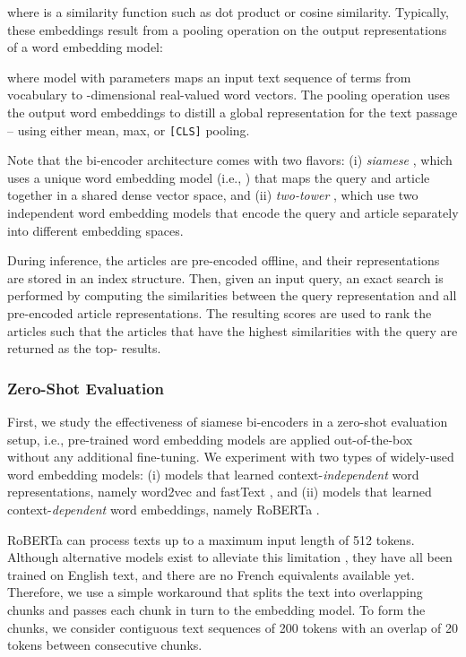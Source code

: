 \documentclass[11pt]{article}
\begin{document}
where  is a similarity function such as dot product or cosine similarity. Typically, these embeddings result from a pooling operation on the output representations of a word embedding model:

where model  with parameters  maps an input text sequence of  terms from vocabulary  to -dimensional real-valued word vectors. The pooling operation  uses the output word embeddings to distill a global representation for the text passage -- using either mean, max, or \texttt{[CLS]} pooling. 

Note that the bi-encoder architecture comes with two flavors: (i) \textsl{siamese} \citep{reimers2019sentence, xiong2021approximate}, which uses a unique word embedding model (i.e., ) that maps the query and article together in a shared dense vector space, and (ii) \textsl{two-tower} \citep{yang2020multilingual, karpukhin2020dense}, which use two independent word embedding models that encode the query and article separately into different embedding spaces.

During inference, the articles are pre-encoded offline, and their representations are stored in an index structure. Then, given an input query, an exact search is performed by computing the similarities between the query representation and all pre-encoded article representations. The resulting scores are used to rank the articles such that the  articles that have the highest similarities with the query are returned as the top- results.



\subsubsection{Zero-Shot Evaluation}
First, we study the effectiveness of siamese bi-encoders in a zero-shot evaluation setup, i.e., pre-trained word embedding models are applied out-of-the-box without any additional fine-tuning. We experiment with two types of widely-used word embedding models: (i) models that learned context-\textit{independent} word representations, namely word2vec \citep{mikolov2013efficient,mikolov2013distributed} and fastText \citep{bojanowski2017enriching}, and (ii) models that learned context-\textit{dependent} word embeddings, namely RoBERTa \citep{liu2019roberta}. 

RoBERTa can process texts up to a maximum input length of 512 tokens. Although alternative models exist to alleviate this limitation \citep{beltagy2020longformer, ainslie2020etc}, they have all been trained on English text, and there are no French equivalents available yet. Therefore, we use a simple workaround that splits the text into overlapping chunks and passes each chunk in turn to the embedding model. To form the chunks, we consider contiguous text sequences of 200 tokens with an overlap of 20 tokens between consecutive chunks.
\end{document}
